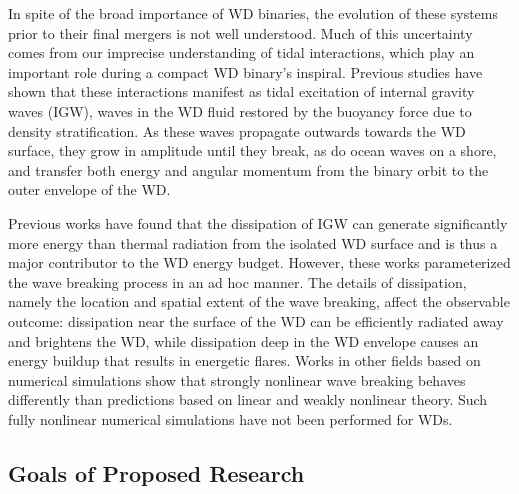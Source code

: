 \documentclass[12pt,
        usenames, %
        dvipsnames %
    ]{article}
\begin{document}
In spite of the broad importance of WD binaries, the evolution of these systems
prior to their final mergers is not well understood. Much of this uncertainty
comes from our imprecise understanding of tidal interactions, which play an
important role during a compact WD binary's inspiral\cite{fullerII}. Previous
studies have shown that these interactions manifest as tidal excitation of
internal gravity waves (IGW), waves in the WD fluid restored by the buoyancy
force due to density stratification\cite{fullerI}. As these waves propagate
outwards towards the WD surface, they grow in amplitude until they break, as do
ocean waves on a shore, and transfer both energy and angular momentum from the
binary orbit to the outer envelope of the WD\cite{fullerI,fullerII}.

Previous works have found that the dissipation of IGW can generate significantly
more energy than thermal radiation from the isolated WD surface and is thus a
major contributor to the WD energy budget\cite{fullerII,fullerIV}. However,
these works parameterized the wave breaking process in an ad hoc manner. The
details of dissipation, namely the location and spatial extent of the wave
breaking, affect the observable outcome: dissipation near the surface of the WD
can be efficiently radiated away and brightens the WD, while dissipation
deep in the WD envelope causes an energy buildup that results in energetic
flares\cite{tidal_novae}. Works in other fields based on numerical simulations
show that strongly nonlinear wave breaking behaves differently than predictions
based on linear and weakly nonlinear theory\cite{winters1994,barker_ogilvie}.
Such fully nonlinear numerical simulations have not been performed for WDs.

\subsection{Goals of Proposed Research}
\end{document}
